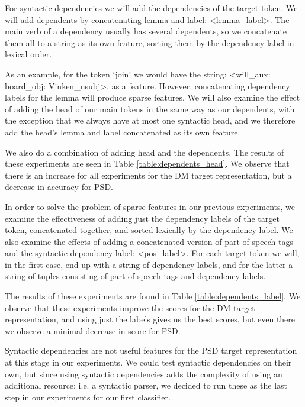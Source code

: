 For syntactic dependencies we will add the dependencies of the target token. We will add dependents by concatenating lemma and label: <lemma\_label>. The main verb of a dependency usually has several dependents, so we concatenate them all to a string as its own feature, sorting them by the dependency label in lexical order. 

As an example, for the token `join' we would have the string: <will\_aux: board\_obj: Vinken\_nsubj>, as a feature. However, concatenating dependency labels for the lemma will produce sparse features. We will also examine the effect of adding the head of our main tokens in the same way as our dependents, with the exception that we always have at most one syntactic head, and we therefore add the head's lemma and label concatenated as its own feature. 

We also do a combination of adding head and the dependents. The results of these experiments are seen in Table \ref{table:dependents_head}. We observe that there is an increase for all experiments for the DM target representation, but a decrease in accuracy for PSD.

In order to solve the problem of sparse features in our previous experiments, we examine the effectiveness of adding just the dependency labels of the target token, concatenated together, and sorted lexically by the dependency label. We also examine the effects of adding a concatenated version of part of speech tags and the syntactic dependency label: <pos\_label>. For each target token we will, in the first case, end up with a string of dependency labels, and for the latter a string of tuples consisting of part of speech tags and dependency labels.

The results of these experiments are found in Table \ref{table:dependents_label}. We observe that these experiments improve the scores for the DM target representation, and using just the labels gives us the best scores, but even there we observe a minimal decrease in score for PSD.


Syntactic dependencies are not useful features for the PSD target representation at this stage in our experiments. We could test syntactic dependencies on their own, but since using syntactic dependencies adds the complexity of using an additional resource; i.e. a syntactic parser, we decided to run these as the last step in our experiments for our first classifier.


